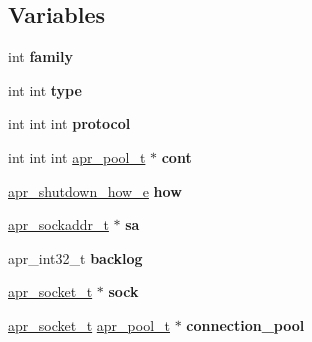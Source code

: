 \subsection*{Variables}
\begin{DoxyCompactItemize}
\item 
\mbox{\label{group__apr__network__io_ga22f2baef89908641382fdf6fb41e8b83}} 
int {\bfseries family}
\item 
\mbox{\label{group__apr__network__io_ga83576a2bbe119057c36ad3be1039daf9}} 
int int {\bfseries type}
\item 
\mbox{\label{group__apr__network__io_gab4455c9ffced5cbd2748a0585c988a2f}} 
int int int {\bfseries protocol}
\item 
\mbox{\label{group__apr__network__io_ga888231ce553dfdd4349f77b1e7582636}} 
int int int \mbox{\hyperlink{group__apr__pools_gaf137f28edcf9a086cd6bc36c20d7cdfb}{apr\+\_\+pool\+\_\+t}} $\ast$ {\bfseries cont}
\item 
\mbox{\label{group__apr__network__io_ga9590c380aa45d7405869b44456f744b5}} 
\mbox{\hyperlink{group__apr__network__io_gae2130f1fa2d0db58c5c3c9c73d9b4009}{apr\+\_\+shutdown\+\_\+how\+\_\+e}} {\bfseries how}
\item 
\mbox{\label{group__apr__network__io_ga5dc1cb3876df6ab646ee9b3d528cbd9f}} 
\mbox{\hyperlink{structapr__sockaddr__t}{apr\+\_\+sockaddr\+\_\+t}} $\ast$ {\bfseries sa}
\item 
\mbox{\label{group__apr__network__io_ga8ab200d7cdc39cd5efe5114a1ebc5969}} 
apr\+\_\+int32\+\_\+t {\bfseries backlog}
\item 
\mbox{\label{group__apr__network__io_ga27d162243808e1e5fb7627d9dba89f9e}} 
\mbox{\hyperlink{structapr__socket__t}{apr\+\_\+socket\+\_\+t}} $\ast$ {\bfseries sock}
\item 
\mbox{\label{group__apr__network__io_gae45304feb96d8b870698bf131e538151}} 
\mbox{\hyperlink{structapr__socket__t}{apr\+\_\+socket\+\_\+t}} \mbox{\hyperlink{group__apr__pools_gaf137f28edcf9a086cd6bc36c20d7cdfb}{apr\+\_\+pool\+\_\+t}} $\ast$ {\bfseries connection\+\_\+pool}

\end{DoxyCompactItemize}
